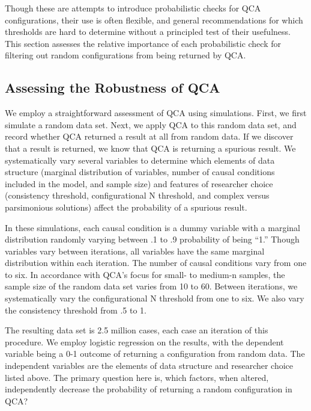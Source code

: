 \documentclass[12pt]{article}
\begin{document}
{Though these are attempts to introduce probabilistic checks for QCA configurations, their use is often flexible, and general recommendations for which thresholds are hard to determine without a principled test of their usefulness. This section assesses the relative importance of each probabilistic check for filtering out random configurations from being returned by QCA. 

\subsection{Assessing the Robustness of QCA}

We employ a straightforward assessment of QCA using simulations. First, we first simulate a random data set. Next, we apply QCA to this random data set, and record whether QCA returned a result at all from random data. If we discover that a result is returned, we know that QCA is returning a spurious result. We systematically vary several variables to determine which elements of data structure (marginal distribution of variables, number of causal conditions included in the model, and sample size) and features of researcher choice (consistency threshold, configurational N threshold, and complex versus parsimonious solutions) affect the probability of a spurious result.  %

In these simulations, each causal condition is a dummy variable with a marginal distribution randomly varying between .1 to .9 probability of being ``1.'' Though variables vary between iterations, all variables have the same marginal distribution within each iteration. The number of causal conditions vary from one to six. In accordance with QCA's focus for small- to medium-n samples, the sample size of the random data set varies from 10 to 60. Between iterations, we systematically vary the configurational N threshold from one to six. We also vary the consistency threshold from .5 to 1.

The resulting data set is 2.5 million cases, each case an iteration of this procedure. We employ logistic regression on the results, with the dependent variable being a 0-1 outcome of returning a configuration from random data. The independent variables are the elements of data structure and researcher choice listed above. The primary question here is, which factors, when altered, independently decrease the probability of returning a random configuration in QCA?

}
\end{document}
